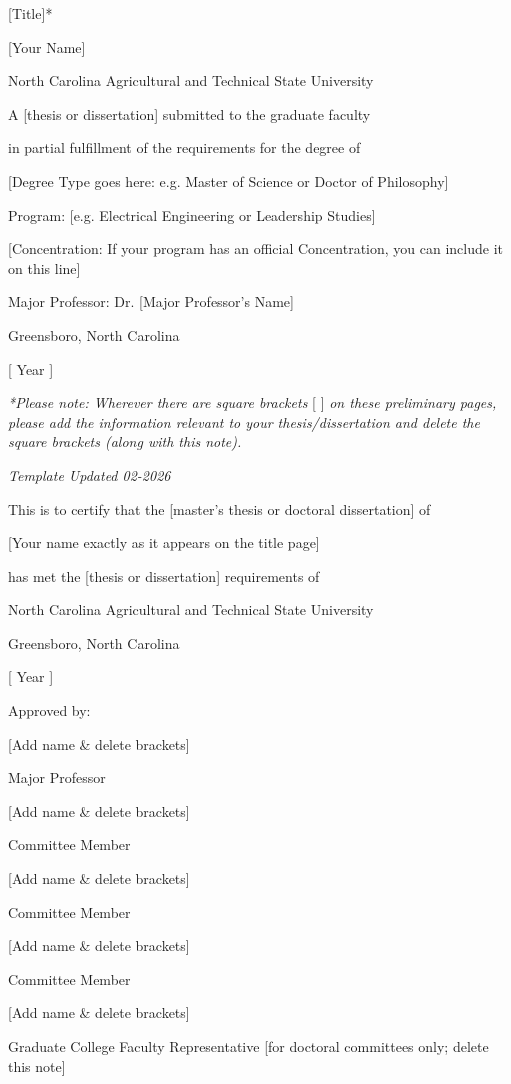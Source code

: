 {[}Title{]}*

{[}Your Name{]}

North Carolina Agricultural and Technical State University

A {[}thesis or dissertation{]} submitted to the graduate faculty

in partial fulfillment of the requirements for the degree of

{[}Degree Type goes here: e.g. Master of Science or Doctor of
Philosophy{]}

Program: {[}e.g. Electrical Engineering or Leadership Studies{]}

{[}Concentration: If your program has an official Concentration, you can
include it on this line{]}

Major Professor: Dr. {[}Major Professor's Name{]}

Greensboro, North Carolina

{[} Year {]}

\emph{*Please note: Wherever there are square brackets} {[} {]} \emph{on
these preliminary pages, please add the information relevant to your
thesis/dissertation and delete the square brackets (along with this
note).}

\emph{Template Updated 02-2026}

This is to certify that the {[}master's thesis or doctoral
dissertation{]} of

{[}Your name exactly as it appears on the title page{]}

has met the {[}thesis or dissertation{]} requirements of

North Carolina Agricultural and Technical State University

Greensboro, North Carolina

{[} Year {]}

Approved by:

{[}Add name \& delete brackets{]}

Major Professor

{[}Add name \& delete brackets{]}

Committee Member

{[}Add name \& delete brackets{]}

Committee Member

{[}Add name \& delete brackets{]}

Committee Member

{[}Add name \& delete brackets{]}

Graduate College Faculty Representative {[}for doctoral committees only;
delete this note{]}

